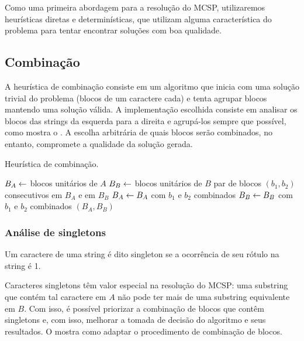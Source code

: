 Como uma primeira abordagem para a resolução do MCSP, utilizaremos heurísticas diretas e determinísticas, que utilizam alguma característica do problema para tentar encontrar soluções com boa qualidade. 

\subsection{Combinação}

    A heurística de combinação consiste em um algoritmo que inicia com uma solução trivial do problema (blocos de um caractere cada) e tenta agrupar blocos mantendo uma solução válida. A implementação escolhida consiste em analisar os blocos das strings da esquerda para a direita e agrupá-los sempre que possível, como mostra o . A escolha arbitrária de quais blocos serão combinados, no entanto, compromete a qualidade da solução gerada.

    \begin{algorithm}[htb]
        \caption{Heurística de combinação.} \label{alg:combine}
        \begin{codebox}
        \li $B_A \leftarrow$ blocos unitários de $A$
        \li $B_B \leftarrow$ blocos unitários de $B$
        \li \Para \Cada par de blocos $(b_1, b_2)$ consecutivos em $B_A$ e em $B_B$ \Faca
            \Do
        \li     $B_A \leftarrow B_A$ com $b_1$ e $b_2$ combinados
        \li     $B_B \leftarrow B_B$ com $b_1$ e $b_2$ combinados
            \End
        \li \Devolva $(B_A, B_B)$
        \end{codebox}
    \end{algorithm}

    \subsubsection{Análise de singletons}

        \begin{definition}[Singleton]
            Um caractere de uma string é dito singleton se a ocorrência de seu rótulo na string é 1.
        \end{definition}

        Caracteres singletons têm valor especial na resolução do MCSP: uma substring que contém tal caractere em $A$ não pode ter mais de uma substring equivalente em $B$. Com isso, é possível priorizar a combinação de blocos que contêm singletons e, com isso, melhorar a tomada de decisão do algoritmo e seus resultados. O  mostra como adaptar o procedimento de combinação de blocos.


